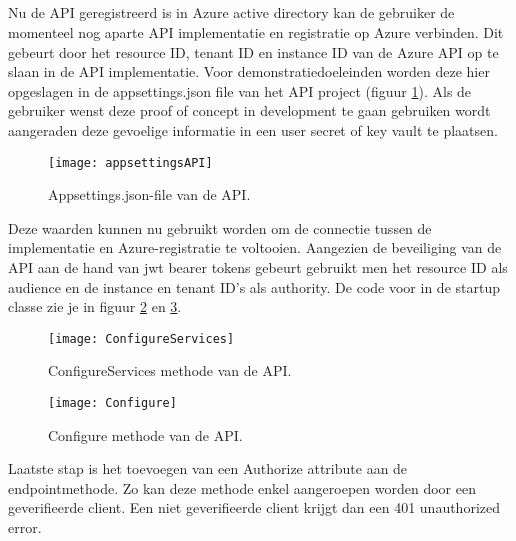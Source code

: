 \subsection{}
Nu de API geregistreerd is in Azure active directory kan de gebruiker de momenteel nog aparte API implementatie en registratie op Azure verbinden. Dit gebeurt door het resource ID, tenant ID en instance ID van de Azure API op te slaan in de API implementatie. Voor demonstratiedoeleinden worden deze hier opgeslagen in de appsettings.json file van het API project (figuur \ref{fig:appsetAPI}). Als de gebruiker wenst deze proof of concept in development te gaan gebruiken wordt aangeraden deze gevoelige informatie in een user secret of key vault te plaatsen.
\begin{figure}[H]
	\centering
	\texttt{[image: appsettingsAPI]} 
	\caption[Appsetingsjosn]{Appsettings.json-file van de API.}
	\label{fig:appsetAPI}
\end{figure}
Deze waarden kunnen nu gebruikt worden om de connectie tussen de implementatie en Azure-registratie te voltooien. Aangezien de beveiliging van de API aan de hand van jwt bearer tokens gebeurt gebruikt men het resource ID als audience en de instance en tenant ID’s als authority. De code voor in de startup classe zie je in figuur \ref{fig:configureServices} en \ref{fig:configure}. 
\begin{figure}[H]
	\centering
	\texttt{[image: ConfigureServices]} 
	\caption[ConfigureServices]{ConfigureServices methode van de API.}
	\label{fig:configureServices}
\end{figure}\newpage
\begin{figure}[H]
	\centering
	\texttt{[image: Configure]} 
	\caption[Configure]{Configure methode van de API.}
	\label{fig:configure}
\end{figure}
Laatste stap is het toevoegen van een Authorize attribute aan de endpointmethode. Zo kan deze methode enkel aangeroepen worden door een geverifieerde client. Een niet geverifieerde client krijgt dan een 401 unauthorized error.
